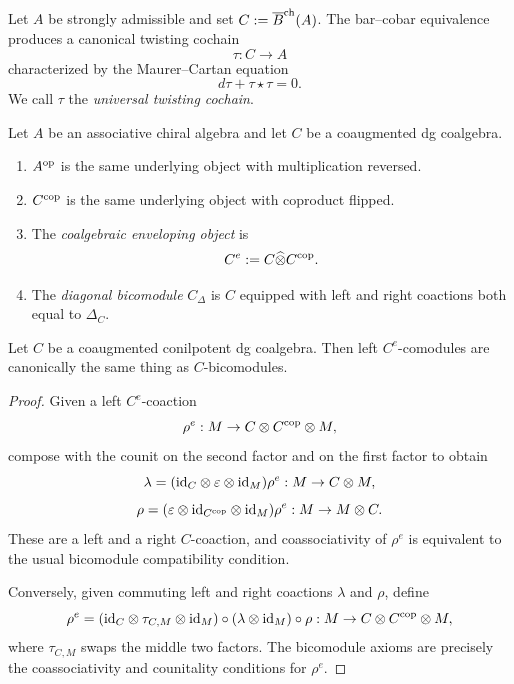 \begin{definition}
Let $A$ be strongly admissible and set $C:=\overline{B}^{\mathrm{ch}}(A)$. The bar--cobar equivalence produces a
canonical twisting cochain
\[
\tau:C\to A
\]
characterized by the Maurer--Cartan equation
\[
d\tau+\tau\star\tau=0.
\]
We call $\tau$ the \emph{universal twisting cochain}.
\end{definition}

\begin{definition}
Let $A$ be an associative chiral algebra and let $C$ be a coaugmented dg coalgebra.
\begin{enumerate}[label=(\alph*)]
\item $A^{\mathrm{op}}$ is the same underlying object with multiplication reversed.
\item $C^{\mathrm{cop}}$ is the same underlying object with coproduct flipped.
\item The \emph{coalgebraic enveloping object} is
\[
C^e:=C\widehat\otimes C^{\mathrm{cop}}.
\]
\item The \emph{diagonal bicomodule} $C_\Delta$ is $C$ equipped with left and right coactions both
equal to $\Delta_C$.
\end{enumerate}
\end{definition}

\begin{lemma}
Let $C$ be a coaugmented conilpotent dg coalgebra. Then left $C^e$-comodules are canonically the
same thing as $C$-bicomodules.
\end{lemma}

\begin{proof}
Given a left $C^e$-coaction
\[
\rho^e:M\to C\otimes C^{\mathrm{cop}}\otimes M,
\]
compose with the counit on the second factor and on the first factor to obtain
\[
\lambda=(\mathrm{id}_C\otimes \varepsilon\otimes \mathrm{id}_M)\rho^e:M\to C\otimes M,
\]
\[
\rho=(\varepsilon\otimes \mathrm{id}_{C^{\mathrm{cop}}}\otimes \mathrm{id}_M)\rho^e:M\to M\otimes C.
\]
These are a left and a right $C$-coaction, and coassociativity of $\rho^e$ is equivalent to the
usual bicomodule compatibility condition.

Conversely, given commuting left and right coactions $\lambda$ and $\rho$, define
\[
\rho^e
=
(\mathrm{id}_C\otimes \tau_{C,M}\otimes \mathrm{id}_M)\circ(\lambda\otimes \mathrm{id}_M)\circ \rho
:
M\to C\otimes C^{\mathrm{cop}}\otimes M,
\]
where $\tau_{C,M}$ swaps the middle two factors. The bicomodule axioms are precisely the
coassociativity and counitality conditions for $\rho^e$.
\end{proof}

